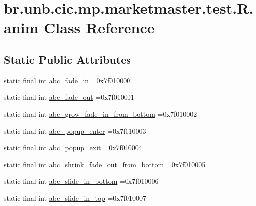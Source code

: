 \hypertarget{classbr_1_1unb_1_1cic_1_1mp_1_1marketmaster_1_1test_1_1R_1_1anim}{}\section{br.\+unb.\+cic.\+mp.\+marketmaster.\+test.\+R.\+anim Class Reference}
\label{classbr_1_1unb_1_1cic_1_1mp_1_1marketmaster_1_1test_1_1R_1_1anim}
\subsection*{Static Public Attributes}
\begin{DoxyCompactItemize}
\item 
static final int \mbox{\hyperlink{classbr_1_1unb_1_1cic_1_1mp_1_1marketmaster_1_1test_1_1R_1_1anim_a8d15c45fc97526c59e932fcf6292be82}{abc\+\_\+fade\+\_\+in}} =0x7f010000
\item 
static final int \mbox{\hyperlink{classbr_1_1unb_1_1cic_1_1mp_1_1marketmaster_1_1test_1_1R_1_1anim_ad71e9302cb90730d4a8c63e1e98415b4}{abc\+\_\+fade\+\_\+out}} =0x7f010001
\item 
static final int \mbox{\hyperlink{classbr_1_1unb_1_1cic_1_1mp_1_1marketmaster_1_1test_1_1R_1_1anim_a78bd668cc1f7423126984133506de2a2}{abc\+\_\+grow\+\_\+fade\+\_\+in\+\_\+from\+\_\+bottom}} =0x7f010002
\item 
static final int \mbox{\hyperlink{classbr_1_1unb_1_1cic_1_1mp_1_1marketmaster_1_1test_1_1R_1_1anim_afea5bbd858e518a5ffcac7af181cd4b5}{abc\+\_\+popup\+\_\+enter}} =0x7f010003
\item 
static final int \mbox{\hyperlink{classbr_1_1unb_1_1cic_1_1mp_1_1marketmaster_1_1test_1_1R_1_1anim_aba1b8c099beddf984a0e770956791a95}{abc\+\_\+popup\+\_\+exit}} =0x7f010004
\item 
static final int \mbox{\hyperlink{classbr_1_1unb_1_1cic_1_1mp_1_1marketmaster_1_1test_1_1R_1_1anim_aa9fdabe671370139406d600fc22fd87e}{abc\+\_\+shrink\+\_\+fade\+\_\+out\+\_\+from\+\_\+bottom}} =0x7f010005
\item 
static final int \mbox{\hyperlink{classbr_1_1unb_1_1cic_1_1mp_1_1marketmaster_1_1test_1_1R_1_1anim_a6535b693958378c52a6c30fd912d1de7}{abc\+\_\+slide\+\_\+in\+\_\+bottom}} =0x7f010006
\item 
static final int \mbox{\hyperlink{classbr_1_1unb_1_1cic_1_1mp_1_1marketmaster_1_1test_1_1R_1_1anim_a5c93b51a780e413edfa9dcc36c23ceb5}{abc\+\_\+slide\+\_\+in\+\_\+top}} =0x7f010007

\end{DoxyCompactItemize}
